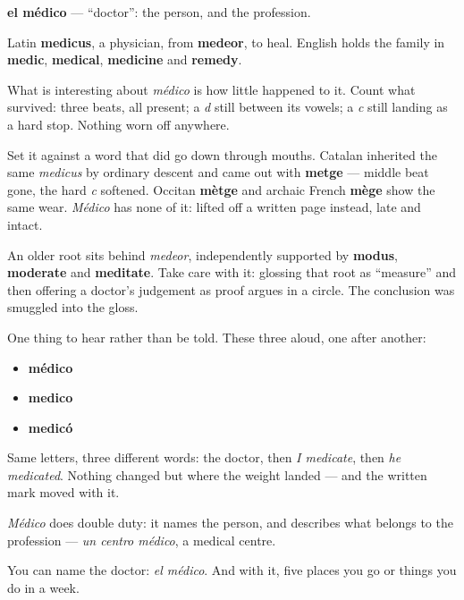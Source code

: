 \begin{cousinweb}
\textbf{el médico} — \textquotedblleft{}doctor\textquotedblright{}: the person, and the profession.

Latin \textbf{medicus}, a physician, from \textbf{medeor}, to heal. English holds the family in \textbf{medic}, \textbf{medical}, \textbf{medicine} and \textbf{remedy}.

What is interesting about \emph{médico} is how little happened to it. Count what survived: three beats, all present; a \emph{d} still between its vowels; a \emph{c} still landing as a hard stop. Nothing worn off anywhere.

Set it against a word that did go down through mouths. Catalan inherited the same \emph{medicus} by ordinary descent and came out with \textbf{metge} — middle beat gone, the hard \emph{c} softened. Occitan \textbf{mètge} and archaic French \textbf{mège} show the same wear. \emph{Médico} has none of it: lifted off a written page instead, late and intact.

An older root sits behind \emph{medeor}, independently supported by \textbf{modus}, \textbf{moderate} and \textbf{meditate}. Take care with it: glossing that root as \textquotedblleft{}measure\textquotedblright{} and then offering a doctor's judgement as proof argues in a circle. The conclusion was smuggled into the gloss.

One thing to hear rather than be told. These three aloud, one after another:

\begin{itemize}
\raggedright
  \item \textbf{médico}
  \item \textbf{medico}
  \item \textbf{medicó}
\end{itemize}

Same letters, three different words: the doctor, then \emph{I medicate}, then \emph{he medicated}. Nothing changed but where the weight landed — and the written mark moved with it.

\emph{Médico} does double duty: it names the person, and describes what belongs to the profession — \emph{un centro médico}, a medical centre.
\end{cousinweb}

\begin{grammarlens}[title={What you've built}]
You can name the doctor: \emph{el médico}. And with it, five places you go or things you do in a week.
\end{grammarlens}

